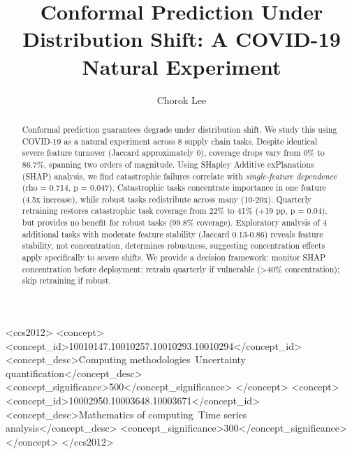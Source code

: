\documentclass[sigconf]{acmart}
\begin{document}
\title{Conformal Prediction Under Distribution Shift: A COVID-19 Natural Experiment}

\author{Chorok Lee}

\begin{abstract}
Conformal prediction guarantees degrade under distribution shift.
We study this using COVID-19 as a natural experiment across 8 supply chain tasks.
Despite identical severe feature turnover (Jaccard approximately 0), coverage drops vary
from 0\% to 86.7\%, spanning two orders of magnitude. Using SHapley Additive exPlanations
(SHAP) analysis, we find catastrophic failures correlate with \emph{single-feature
dependence} (rho = 0.714, p = 0.047). Catastrophic tasks concentrate importance
in one feature (4.5x increase), while robust tasks redistribute across many
(10-20x). Quarterly retraining restores catastrophic task coverage from 22\%
to 41\% (+19 pp, p = 0.04), but provides no benefit for robust tasks (99.8\%
coverage). Exploratory analysis of 4 additional tasks with moderate feature stability
(Jaccard 0.13-0.86) reveals feature stability, not concentration, determines
robustness, suggesting concentration effects apply specifically to severe shifts.
We provide a decision framework: monitor SHAP concentration before deployment;
retrain quarterly if vulnerable (>40\% concentration); skip retraining if robust.
\end{abstract}

\begin{CCSXML}
<ccs2012>
   <concept>
       <concept_id>10010147.10010257.10010293.10010294</concept_id>
       <concept_desc>Computing methodologies~Uncertainty quantification</concept_desc>
       <concept_significance>500</concept_significance>
   </concept>
   <concept>
       <concept_id>10002950.10003648.10003671</concept_id>
       <concept_desc>Mathematics of computing~Time series analysis</concept_desc>
       <concept_significance>300</concept_significance>
   </concept>
</ccs2012>
\end{CCSXML}


\end{document}
